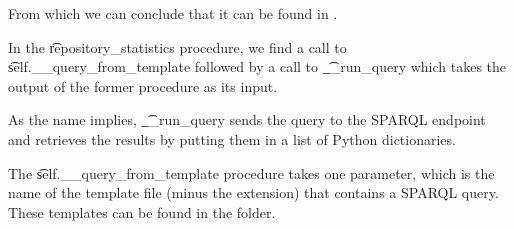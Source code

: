 From which we can conclude that it can be found in
.

In the \t{repository\_statistics} procedure, we find a call to
\t{self.\_\_query\_from\_template} followed by a call to \t{\_\_run\_query}
which takes the output of the former procedure as its input.

As the name implies, \t{\_\_run\_query} sends the query to the SPARQL endpoint
and retrieves the results by putting them in a list of Python dictionaries.

The \t{self.\_\_query\_from\_template} procedure takes one parameter, which is
the name of the template file (minus the extension) that contains a SPARQL
query.  These templates can be found in the
 folder.
